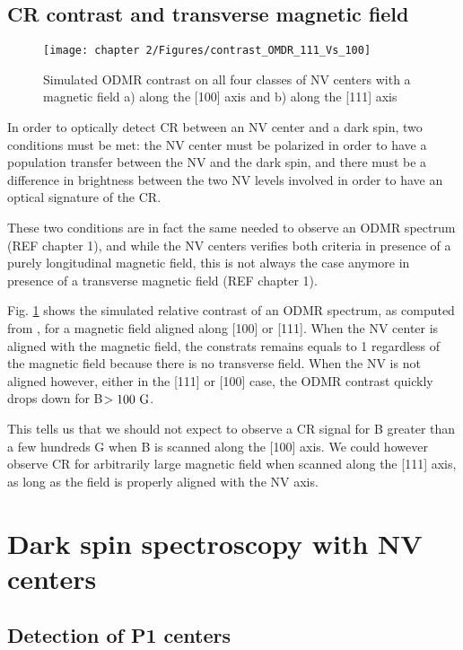 \documentclass[a4paper,11pt]{report}
\begin{document}
\begin{refsection}
\subsection{CR contrast and transverse magnetic field}
\label{CR contrast}

\begin{figure}[h]
\centering
\texttt{[image: chapter 2/Figures/contrast\_OMDR\_111\_Vs\_100]}
\caption{Simulated ODMR contrast on all four classes of NV centers with a magnetic field a) along the [100] axis and b) along the [111] axis}
\label{121 vs 22 contrast}
\end{figure}

In order to optically detect CR between an NV center and a dark spin, two conditions must be met: the NV center must be polarized in order to have a population transfer between the NV and the dark spin, and there must be a difference in brightness between the two NV levels involved in order to have an optical signature of the CR.

These two conditions are in fact the same needed to observe an ODMR spectrum (REF chapter 1), and while the NV centers verifies both criteria in presence of a purely longitudinal magnetic field, this is not always the case anymore in presence of a transverse magnetic field (REF chapter 1).

Fig. \ref{121 vs 22 contrast} shows the simulated relative contrast of an ODMR spectrum, as computed from \citep{tetienne2012magnetic}, for a magnetic field aligned along [100] or [111]. When the NV center is aligned with the magnetic field, the constrats remains equals to 1 regardless of the magnetic field because there is no transverse field. When the NV is not aligned however, either in the [111] or [100] case, the ODMR contrast quickly drops down for B$>100\ \rm G$.

This tells us that we should not expect to observe a CR signal for B greater than a few hundreds G when B is scanned along the [100] axis. We could however observe CR for arbitrarily large magnetic field when scanned along the [111] axis, as long as the field is properly aligned with the NV axis.

\section{Dark spin spectroscopy with NV centers}

\subsection{Detection of P1 centers}


\end{refsection}
\end{document}
